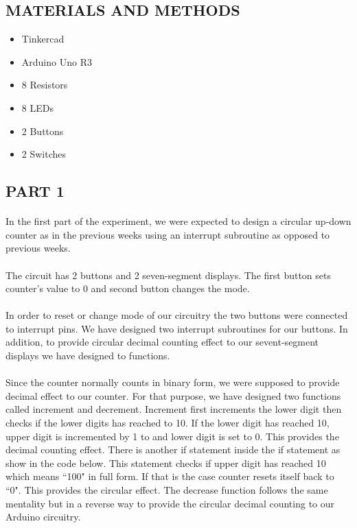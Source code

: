 \documentclass[pdftex,12pt,a4paper]{article}
\begin{document}
\begin{flushleft}
\section{MATERIALS AND METHODS}
\begin{itemize}
    \item Tinkercad
    \item Arduino Uno R3
    \item 8 Resistors
    \item 8 LEDs
    \item 2 Buttons
    \item 2 Switches
\end{itemize}

\subsection{PART 1}
\paragraph{}
In the first part of the experiment, we were expected to design a circular up-down counter as in the previous weeks using an interrupt subroutine as opposed to previous weeks. 
\paragraph{}
The circuit has 2 buttons and 2 seven-segment displays. The first button sets counter's value to 0 and second button changes the mode. 
\paragraph{}
In order to reset or change mode of our circuitry the two buttons were connected to interrupt pins. We have designed two interrupt subroutines for our buttons. In addition, to provide circular decimal counting effect to our sevent-segment displays we have designed to functions.
\paragraph{}
Since the counter normally counts in binary form, we were supposed to provide decimal effect to our counter. For that purpose, we have designed two functions called increment and decrement. Increment first increments the lower digit then checks if the lower digits has reached to 10. If the lower digit has reached 10, upper digit is incremented by 1 to and lower digit is set to 0. This provides the decimal counting effect. There is another if statement inside the if statement as show in the code below. This statement checks if upper digit has reached 10 which means ``100" in full form. If that is the case counter resets itself back to ``0". This provides the circular effect. The decrease function follows the same mentality but in a reverse way to provide the circular decimal counting to our Arduino circuitry.

\end{flushleft}
\end{document}
